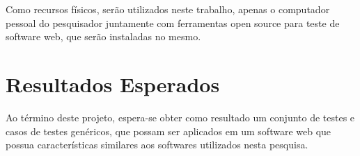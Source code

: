 \documentclass[12pt]{article}
\begin{document}
	Como recursos físicos, serão utilizados neste trabalho, apenas o computador pessoal do pesquisador juntamente
	com ferramentas open source para teste de software web, que serão instaladas no mesmo.
	
	\section{Resultados Esperados}
	
	Ao término deste projeto, espera-se obter como resultado um conjunto de testes e casos de testes genéricos,
	que possam ser aplicados em um software web que possua características similares aos softwares utilizados
	nesta pesquisa.
	
	
	
	
\end{document}
